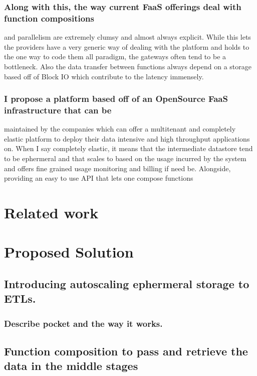 \documentclass[12pt,titlepage]{article}
\begin{document}
\subsubsection{Along with this, the way current FaaS offerings deal with function compositions}
\label{sec:org1b9d92b}
and parallelism are extremely clumsy and almost always explicit. While this lets
the providers have a very generic way of dealing with the platform and holds to
the one way to code them all paradigm, the gateways often tend to be a
bottleneck. Also the data transfer between functions always depend on a storage
based off of Block IO which contribute to the latency immensely.
\subsubsection{I propose a platform based off of an OpenSource FaaS infrastructure that can be}
\label{sec:orgf59ec19}
maintained by the companies which can offer a multitenant and completely elastic
platform to deploy their data intensive and high throughput applications on.
When I say completely elastic, it means that the intermediate datastore tend to
be ephermeral and that scales to based on the usage incurred by the system and
offers fine grained usage monitoring and billing if need be. Alongside,
providing an easy to use API that lets one compose functions 




\section{Related work}
\label{sec:orgf7add76}
\section{Proposed Solution}
\label{sec:org60892b8}
\subsection{Introducing autoscaling ephermeral storage to ETLs.}
\label{sec:org4b00788}
\subsubsection{Describe pocket and the way it works.}
\label{sec:org780d159}
\subsection{Function composition to pass and retrieve the data in the middle stages}
\label{sec:orge07dbfb}
\end{document}
